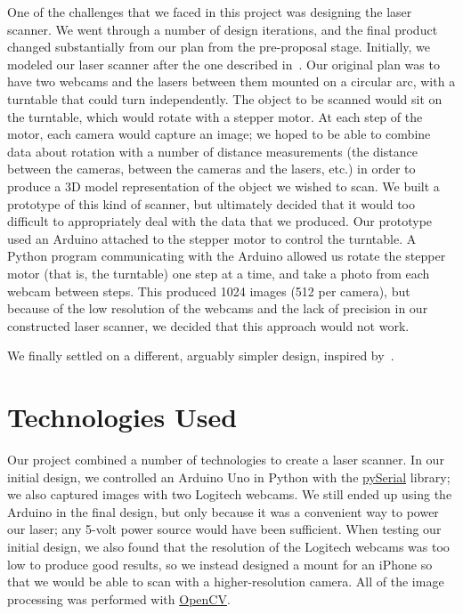 \documentclass[12pt, letterpaper]{article}
\begin{document}
One of the challenges that we faced in this project was designing the laser scanner.
We went through a number of design iterations, and the final product changed substantially
from our plan from the pre-proposal stage. Initially, we modeled our laser scanner after
the one described in~\cite{sardau}. Our original plan was to have two webcams and the
lasers between them mounted on a circular arc, with a turntable that could turn
independently. The object to be scanned would sit on the turntable, which would rotate
with a stepper motor. At each step of the motor, each camera would capture
an image; we hoped to be able to combine data about rotation with a number of distance
measurements (the distance between the cameras, between the cameras and the lasers, etc.)
in order to produce a 3D model representation of the object we wished to scan.
We built a prototype of this kind of scanner, but ultimately decided that it would
too difficult to appropriately deal with the data that we produced. Our prototype used
an Arduino attached to the stepper motor to control the turntable. A Python program
communicating with the Arduino allowed us rotate the stepper motor (that is, the turntable)
one step at a time, and take a photo from each webcam between steps. This produced
1024 images (512 per camera), but because of the low resolution of the webcams and
the lack of precision in our constructed laser scanner, we decided that this approach
would not work.

We finally settled on a different, arguably simpler design, inspired by~\cite{dentroman}.

\section{Technologies Used} \label{technology}
Our project combined a number of technologies to create a laser scanner.
In our initial design, we controlled an Arduino Uno in Python with the
\href{https://github.com/pyserial/pyserial}{pySerial} library; we also
captured images with two Logitech webcams. We still ended up using the
Arduino in the final design, but only because it was a convenient way to
power our laser; any 5-volt power source would have been sufficient.
When testing our initial design, we also found that the resolution of
the Logitech webcams was too low to produce good results, so we instead
designed a mount for an iPhone so that we would be able to scan with a
higher-resolution camera. All of the image processing was performed with
\href{http://opencv.org}{OpenCV}.
\end{document}
